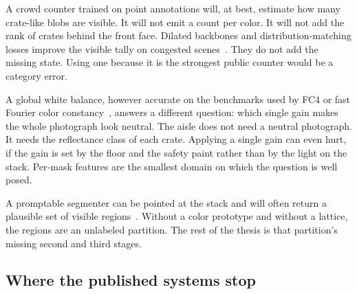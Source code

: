 A crowd counter trained on point annotations will, at best, estimate how many crate-like blobs are visible. It will not emit a count per color. It will not add the rank of crates behind the front face. Dilated backbones and distribution-matching losses improve the visible tally on congested scenes~\cite{li2018csrnet,wang2020dmcount}. They do not add the missing state. Using one because it is the strongest public counter would be a category error.

A global white balance, however accurate on the benchmarks used by FC4 or fast Fourier color constancy~\cite{hu2017fc4,barron2017ffcc}, answers a different question: which single gain makes the whole photograph look neutral. The aisle does not need a neutral photograph. It needs the reflectance class of each crate. Applying a single gain can even hurt, if the gain is set by the floor and the safety paint rather than by the light on the stack. Per-mask features are the smallest domain on which the question is well posed.

A promptable segmenter can be pointed at the stack and will often return a plausible set of visible regions~\cite{kirillov2023sam,ravi2024sam2}. Without a color prototype and without a lattice, the regions are an unlabeled partition. The rest of the thesis is that partition's missing second and third stages.

\subsection{Where the published systems stop}
\label{sec:gap-table}

